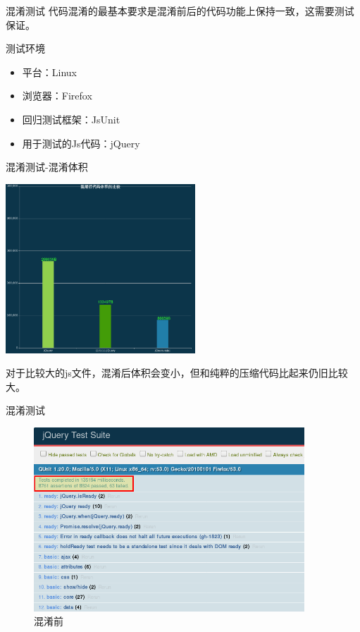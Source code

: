 \documentclass[presentation]{beamer}
\begin{document}
\begin{frame}[label=sec-20]{混淆测试}
代码混淆的最基本要求是混淆前后的代码功能上保持一致，这需要测试保证。

\begin{block}{测试环境}
\begin{itemize}
\item 平台：Linux
\item 浏览器：Firefox
\item 回归测试框架：JsUnit
\item 用于测试的Js代码：jQuery
\end{itemize}
\end{block}
\end{frame}
\begin{frame}[label=sec-21]{混淆测试-混淆体积}
\begin{center}
\includegraphics[width=2.8in]{./presentation03-01.png}
\end{center}

对于比较大的js文件，混淆后体积会变小，但和纯粹的压缩代码比起来仍旧比较大。
\end{frame}
\begin{frame}[label=sec-22]{混淆测试}
\begin{center}
\begin{figure}[htb]
\centering
\includegraphics[width=4in]{./presentation03-03.png}
\caption{混淆前}
\end{figure}
\end{center}
\end{frame}
\end{document}
